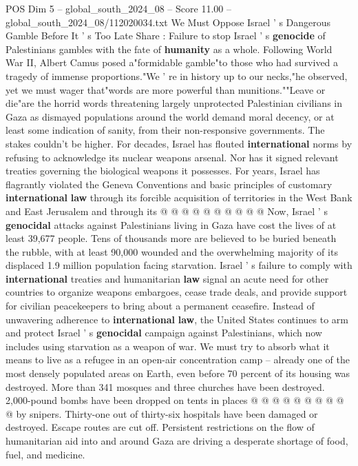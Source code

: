 \begin{textsample}{POS Dim 5 – global\_south\_2024\_08 – Score 11.00 – global\_south\_2024\_08/112020034.txt}  \label{ex:f5_pos_290}
We Must Oppose Israel ' s Dangerous Gamble Before It ' s Too Late Share : Failure to stop Israel ' s \textbf{genocide} of Palestinians gambles with the fate of \textbf{humanity} as a whole.
Following World War II, Albert Camus posed a"formidable gamble"to those who had survived a tragedy of immense proportions."We ' re in history up to our necks,"he observed, yet we must wager that"words are more powerful than munitions.""Leave or die"are the horrid words threatening largely unprotected Palestinian civilians in Gaza as dismayed populations around the world demand moral decency, or at least some indication of sanity, from their non-responsive governments.
The stakes couldn't be higher.
For decades, Israel has flouted \textbf{international} norms by refusing to acknowledge its nuclear weapons arsenal.
Nor has it signed relevant treaties governing the biological weapons it possesses.
For years, Israel has flagrantly violated the Geneva Conventions and basic principles of customary \textbf{international} \textbf{law} through its forcible acquisition of territories in the West Bank and East Jerusalem and through its @ @ @ @ @ @ @ @ @ @ Now, Israel ' s \textbf{genocidal} attacks against Palestinians living in Gaza have cost the lives of at least 39,677 people.
Tens of thousands more are believed to be buried beneath the rubble, with at least 90,000 wounded and the overwhelming majority of its displaced 1.9 million population facing starvation.
Israel ' s failure to comply with \textbf{international} treaties and humanitarian \textbf{law} signal an acute need for other countries to organize weapons embargoes, cease trade deals, and provide support for civilian peacekeepers to bring about a permanent ceasefire.
Instead of unwavering adherence to \textbf{international} \textbf{law}, the United States continues to arm and protect Israel ' s \textbf{genocidal} campaign against Palestinians, which now includes using starvation as a weapon of war.
We must try to absorb what it means to live as a refugee in an open-air concentration camp -- already one of the most densely populated areas on Earth, even before 70 percent of its housing was destroyed.
More than 341 mosques and three churches have been destroyed. 2,000-pound bombs have been dropped on tents in places @ @ @ @ @ @ @ @ @ @ by snipers.
Thirty-one out of thirty-six hospitals have been damaged or destroyed.
Escape routes are cut off.
Persistent restrictions on the flow of humanitarian aid into and around Gaza are driving a desperate shortage of food, fuel, and medicine.

\end{textsample}
